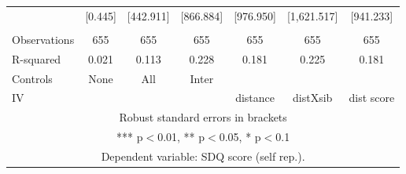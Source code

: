 \begin{tabular}{lcccccc}
 & [0.445] & [442.911] & [866.884] & [976.950] & [1,621.517] & [941.233] \\
 &  &  &  &  &  &  \\
Observations & 655 & 655 & 655 & 655 & 655 & 655 \\
R-squared & 0.021 & 0.113 & 0.228 & 0.181 & 0.225 & 0.181 \\
Controls & None & All & Inter &  &  &  \\
 IV &  &  &  & distance & distXsib & dist score \\ \hline
\multicolumn{7}{c}{ Robust standard errors in brackets} \\
\multicolumn{7}{c}{ *** p$<$0.01, ** p$<$0.05, * p$<$0.1} \\
\multicolumn{7}{c}{ Dependent variable: SDQ score (self rep.).} \\
\end{tabular}

